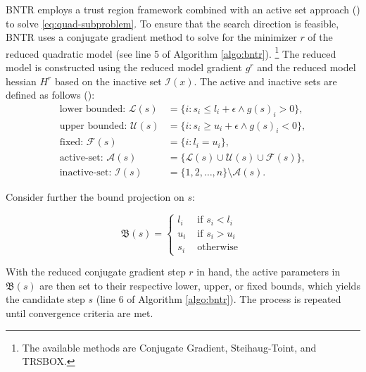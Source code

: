 \noindent BNTR employs a trust region framework combined with an active set approach (\cite{TAO21}) to solve \ref{eq:quad-subproblem}. To ensure that the search direction is feasible, BNTR uses a conjugate gradient method to solve for the minimizer $r$ of the reduced quadratic model (see line 5 of Algorithm \ref{algo:bntr}). \footnote{The available methods are Conjugate Gradient, Steihaug-Toint, and TRSBOX.}
The reduced model is constructed using the reduced model gradient $g^r$ and the reduced model hessian $H^r$ based on the inactive set $\mathcal{I}(x)$. The active and inactive sets are defined as follows (\cite{Bertsekas1982}):
\begin{align*}
\text{lower bounded: } \mathcal{L}(s) & = \{i: s_i \leq l_i + \epsilon \wedge g(s)_i > 0\}, \\
\text{upper bounded: } \mathcal{U}(s) & = \{i: s_i \geq u_i + \epsilon \wedge g(s)_i < 0\}, \\
\text{fixed: } \mathcal{F}(s) & = \{i: l_i = u_i\}, \\
\text{active-set: } \mathcal{A}(s) & = \{\mathcal{L}(s) \cup \mathcal{U}(s) \cup \mathcal{F}(s)\}, \\
\text{inactive-set: } \mathcal{I}(s) & = \{1,2,\ldots,n\} \setminus \mathcal{A}(s).
\end{align*}

\noindent Consider further the bound projection on $s$:

$$
\mathfrak{B}(s)= \begin{cases}l_i & \text { if } s_i<l_i \\ u_i & \text { if } s_i>u_i \\ s_i & \text { otherwise }\end{cases}
$$

\noindent With the reduced conjugate gradient step $r$ in hand, the active parameters in $\mathfrak{B}(s)$ are then set to their respective lower, upper, or fixed bounds, which yields the candidate step $s$ (line 6 of Algorithm \ref{algo:bntr}). The process is repeated until convergence criteria are met.

